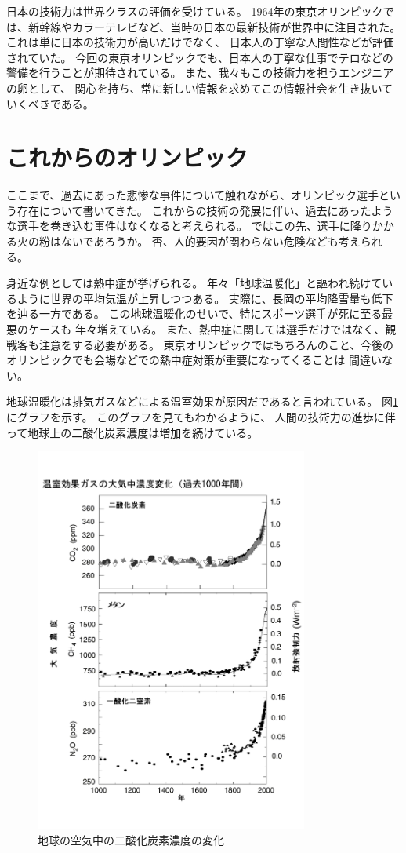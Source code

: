 \documentclass[]{jsarticle}
\begin{document}
日本の技術力は世界クラスの評価を受けている。
1964年の東京オリンピックでは、新幹線やカラーテレビなど、当時の日本の最新技術が世界中に注目された。
これは単に日本の技術力が高いだけでなく、
日本人の丁寧な人間性などが評価されていた。
今回の東京オリンピックでも、日本人の丁寧な仕事でテロなどの警備を行うことが期待されている。
また、我々もこの技術力を担うエンジニアの卵として、
関心を持ち、常に新しい情報を求めてこの情報社会を生き抜いていくべきである。

\section{これからのオリンピック}
ここまで、過去にあった悲惨な事件について触れながら、オリンピック選手という存在について書いてきた。
これからの技術の発展に伴い、過去にあったような選手を巻き込む事件はなくなると考えられる。
ではこの先、選手に降りかかる火の粉はないであろうか。
否、人的要因が関わらない危険なども考えられる。

身近な例としては熱中症が挙げられる。
年々「地球温暖化」と謳われ続けているように世界の平均気温が上昇しつつある。
実際に、長岡の平均降雪量も低下を辿る一方である。
この地球温暖化のせいで、特にスポーツ選手が死に至る最悪のケースも
年々増えている。
また、熱中症に関しては選手だけではなく、観戦客も注意をする必要がある。
東京オリンピックではもちろんのこと、今後のオリンピックでも会場などでの熱中症対策が重要になってくることは
間違いない。

地球温暖化は排気ガスなどによる温室効果が原因だであると言われている。
図\ref{fig:graph}にグラフを示す。
このグラフを見てもわかるように、
人間の技術力の進歩に伴って地球上の二酸化炭素濃度は増加を続けている。

\begin{figure}[h]
    \centering
    \includegraphics[width=9cm]{graph.pdf}
    \caption{地球の空気中の二酸化炭素濃度の変化}
    \label{fig:graph}
\end{figure}
\end{document}
